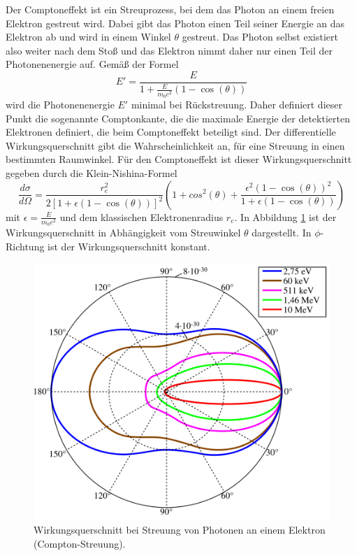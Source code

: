 \noindent Der Comptoneffekt ist ein Streuprozess, bei dem das Photon an einem freien Elektron gestreut wird. Dabei gibt das Photon einen Teil seiner Energie an das Elektron ab und wird in einem Winkel $\theta$ gestreut.
Das Photon selbst existiert also weiter nach dem Stoß und das Elektron nimmt daher nur einen Teil der Photonenenergie auf. Gemäß der Formel 
\begin{equation}
    \label{eq:Compton}
    E' = \frac{E}{1+\frac{E}{m_0c^2}(1-\cos(\theta))}
\end{equation}
wird die Photonenenergie $E'$ minimal bei Rückstreuung. Daher definiert dieser Punkt die sogenannte Comptonkante, die die maximale Energie der detektierten Elektronen 
definiert, die beim Comptoneffekt beteiligt sind. Der differentielle Wirkungsquerschnitt gibt die Wahrscheinlichkeit an, für eine Streuung in einen bestimmten Raumwinkel.
Für den Comptoneffekt ist dieser Wirkungsquerschnitt gegeben durch die Klein-Nishina-Formel
\begin{equation}
    \label{eq:KleinNishina}
    \frac{d\sigma}{d\Omega} = \frac{r_e^2}{2[1+\epsilon(1-\cos(\theta))]^2}\left(1+cos^2(\theta)+\frac{\epsilon^2(1-\cos(\theta))^2}{1+\epsilon(1-\cos(\theta))}\right)
\end{equation}
mit $\epsilon=\frac{E}{m_0c^2}$ und dem klassischen Elektronenradius $r_e$. In Abbildung \ref{fig:Photo} ist der Wirkungsquerschnitt in Abhängigkeit vom Streuwinkel $\theta$ dargestellt.
In $\phi$-Richtung ist der Wirkungsquerschnitt konstant.
\begin{figure}[H]
    \centering
    \includegraphics[scale=0.3]{illustration/Klein-Nishina_distribution-en.svg.png}
    \caption{Wirkungsquerschnitt bei Streuung von Photonen an einem Elektron (Compton-Streuung).\cite {Klein}}
    \label{fig:Photo}
\end{figure}

